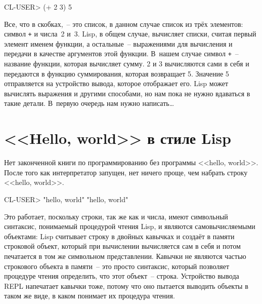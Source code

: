 \begin{myverb}
CL-USER> (+ 2 3)
5
\end{myverb}

Все, что в скобках,~-- это список, в данном случае список из трёх элементов: символ \lstinline{+}
и числа~2 и~3. Lisp, в общем случае, вычисляет списки, считая первый элемент именем
функции, а остальные~-- выражениями для вычисления и передачи в качестве аргументов этой
функции. В~нашем случае символ \lstinline{+}~-- название функции, которая вычисляет сумму. 2 и 3
вычисляются сами в себя и передаются в функцию суммирования, которая возвращает
5. Значение 5 отправляется на устройство вывода, которое отображает его. Lisp может
вычислять выражения и другими способами, но нам пока не нужно вдаваться в такие детали.
В~первую очередь нам нужно написать\ldots

\section{<<Hello, world>> в стиле Lisp}

Нет законченной книги по программированию без программы <<hello,
world>>. После того как
интерпретатор запущен, нет ничего проще, чем набрать строку <<hello, world>>.

\begin{myverb}
CL-USER> "hello, world"
 "hello, world"
\end{myverb}

Это работает, поскольку строки, так же как и числа, имеют символьный синтаксис, понимаемый
процедурой чтения Lisp, и являются самовычисляемыми объектами: Lisp считывает строку в
двойных кавычках и создаёт в памяти строковой объект, который при вычислении вычисляется
сам в себя и потом печатается в том же символьном представлении.  Кавычки не являются
частью строкового объекта в памяти~-- это прос\-то синтаксис, который позволяет процедуре чтения
определить, что этот объект~-- строка. Устройство вывода REPL напечатает кавычки тоже,
потому что оно пытается выводить объекты в таком же виде, в каком понимает их процедура чтения.

